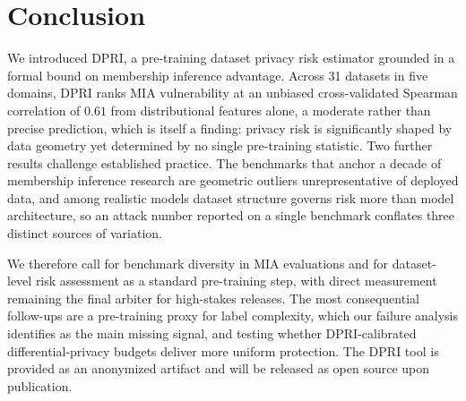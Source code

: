 \section{Conclusion}
\label{sec:conclusion}

We introduced DPRI, a pre-training dataset privacy risk estimator
grounded in a formal bound on membership inference advantage. Across 31
datasets in five domains, DPRI ranks MIA vulnerability at an unbiased
cross-validated Spearman correlation of $0.61$ from distributional
features alone, a moderate rather than precise prediction, which is
itself a finding: privacy risk is significantly shaped by data geometry
yet determined by no single pre-training statistic. Two further results
challenge established practice. The benchmarks that anchor a decade of
membership inference research are geometric outliers unrepresentative of
deployed data, and among realistic models dataset structure governs risk
more than model architecture, so an attack number reported on a single
benchmark conflates three distinct sources of variation.

We therefore call for benchmark diversity in MIA evaluations and for
dataset-level risk assessment as a standard pre-training step, with
direct measurement remaining the final arbiter for high-stakes releases.
The most consequential follow-ups are a pre-training proxy for label
complexity, which our failure analysis identifies as the main missing
signal, and testing whether DPRI-calibrated differential-privacy budgets
deliver more uniform protection. The DPRI tool is provided as an
anonymized artifact and will be released as open source upon
publication.
